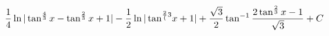 \documentclass[preview]{standalone}
\begin{document}
\begin{align*}
{\frac{1}{4}\ln|\tan^{\frac{4}{3}}x-\tan^{\frac{2}{3}}x+1|-\frac{1}{2}\ln|\tan^{\frac{2}\{3}}x+1|+\frac{\sqrt3}{2}\tan^{-1}\frac{2\tan^{\frac{2}{3}}x-1}{\sqrt3}+C
\end{align*}
\end{document}
